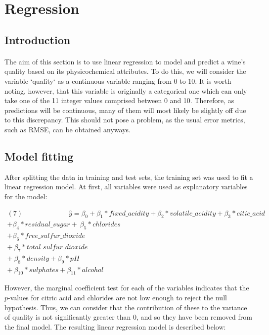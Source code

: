 \documentclass[10pt]{article}
\begin{document}
\section{Regression}

\subsection{Introduction}
\paragraph*{}
The aim of this section is to use linear regression to model and predict a wine's quality based on its physicochemical attributes. To do this, we will consider the variable `quality` as a continuous variable ranging from 0 to 10. It is worth noting, however, that this variable is originally a categorical one which can only take one of the 11 integer values comprised between 0 and 10. Therefore, as predictions will be continuous, many of them will most likely be slightly off due to this discrepancy. This should not pose a problem,  as the usual error metrics, such as RMSE, can be obtained anyways.


\subsection{Model fitting}
After splitting the data in training and test sets, the training set was used to fit a linear regression model. At first, all variables were used as explanatory variables for the model:

\begin{equation*}
\begin{aligned}	
(7) \ \ \ \  \ \ \ \ \ \ \ \ \ \ \ \ \ \ \ \ \ \ \ \ \ \ \ \ \ \ \hat{y} = \beta_0 + \beta_1*fixed\_acidity + \beta_2*volatile\_acidity 
+ \beta_3*citic\_acid  \\ +\beta_4*residual\_sugar 
+ \ \beta_5*chlorides\\ + \beta_6*free\_sulfur\_dioxide  \\+ \ \beta_7*total\_sulfur\_dioxide   
\\ + \ \beta_8*density + \beta_9*pH  \\+ \ \beta_{10}*sulphates + \beta_{11}*alcohol 	
\end{aligned}
\end{equation*}

However, the marginal coefficient test for each of the variables indicates that the $p$-values for citric acid and chlorides are not low enough to reject the null hypothesis. Thus, we can consider that the contribution of these to the variance of quality is not significantly greater than 0, and so they have been removed from the final model. The resulting linear regression model is described below:
\end{document}
